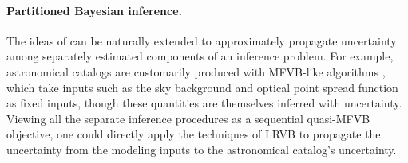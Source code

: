 \paragraph{Partitioned Bayesian inference.}

The ideas of \citep{giordano:2018:covariances} can be naturally extended to
approximately propagate uncertainty among separately estimated components of
an inference problem.  For example, astronomical catalogs are customarily
produced with MFVB-like algorithms \citep{lang:2016:tractor,
regier:2019:cataloging}, which take inputs such as the sky background
and optical point spread function as fixed inputs, though these quantities
are themselves inferred with uncertainty.  Viewing all the separate inference
procedures as a sequential quasi-MFVB objective, one could directly apply
the techniques of LRVB to propagate the uncertainty from the modeling inputs
to the astronomical catalog's uncertainty.



\newpage





